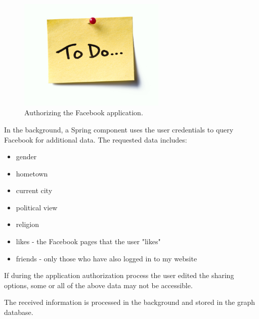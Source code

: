 \documentclass[12pt]{report}
\begin{document}
\begin{figure}[!t]
\centering
\includegraphics[width=7cm]{todo.jpg} 
\caption[Authorizing the Facebook application.]{Authorizing the Facebook application.}
\label{fig.login.fb_app_auth}
\end{figure}

In the background, a Spring component uses the user credentials to query Facebook for additional data. The requested data includes:
\begin{itemize}
\item gender
\item hometown
\item current city
\item political view
\item religion
\item likes - the Facebook pages that the user "likes"
\item friends - only those who have also logged in to my website
\end{itemize}

If during the application authorization process the user edited the sharing options, some or all of the above data may not be accessible.

The received information is processed in the background and stored in the graph database.
\end{document}
